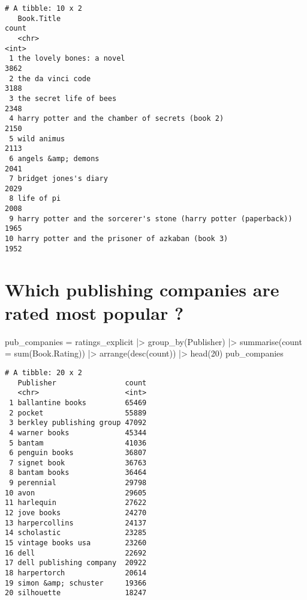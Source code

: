 \documentclass[
]{report}
\newenvironment{Shaded}{\begin{snugshade}}{\end{snugshade}}
\newcommand{\AttributeTok}[1]{\textcolor[rgb]{0.40,0.45,0.13}{#1}}
\newcommand{\DecValTok}[1]{\textcolor[rgb]{0.68,0.00,0.00}{#1}}
\newcommand{\FunctionTok}[1]{\textcolor[rgb]{0.28,0.35,0.67}{#1}}
\newcommand{\NormalTok}[1]{\textcolor[rgb]{0.00,0.23,0.31}{#1}}
\newcommand{\OtherTok}[1]{\textcolor[rgb]{0.00,0.23,0.31}{#1}}
\newcommand{\SpecialCharTok}[1]{\textcolor[rgb]{0.37,0.37,0.37}{#1}}
\begin{document}
\begin{verbatim}
# A tibble: 10 x 2
   Book.Title                                                       count
   <chr>                                                            <int>
 1 the lovely bones: a novel                                         3862
 2 the da vinci code                                                 3188
 3 the secret life of bees                                           2348
 4 harry potter and the chamber of secrets (book 2)                  2150
 5 wild animus                                                       2113
 6 angels &amp; demons                                               2041
 7 bridget jones's diary                                             2029
 8 life of pi                                                        2008
 9 harry potter and the sorcerer's stone (harry potter (paperback))  1965
10 harry potter and the prisoner of azkaban (book 3)                 1952
\end{verbatim}

\section{Which publishing companies are rated most popular
?}\label{which-publishing-companies-are-rated-most-popular}

\begin{Shaded}
\begin{Highlighting}[]
\NormalTok{pub\_companies }\OtherTok{=}\NormalTok{ ratings\_explicit }\SpecialCharTok{|\textgreater{}} \FunctionTok{group\_by}\NormalTok{(Publisher) }\SpecialCharTok{|\textgreater{}}
                             \FunctionTok{summarise}\NormalTok{(}\AttributeTok{count =} \FunctionTok{sum}\NormalTok{(Book.Rating)) }\SpecialCharTok{|\textgreater{}} 
                             \FunctionTok{arrange}\NormalTok{(}\FunctionTok{desc}\NormalTok{(count)) }\SpecialCharTok{|\textgreater{}} \FunctionTok{head}\NormalTok{(}\DecValTok{20}\NormalTok{)}
\NormalTok{pub\_companies}
\end{Highlighting}
\end{Shaded}

\begin{verbatim}
# A tibble: 20 x 2
   Publisher                count
   <chr>                    <int>
 1 ballantine books         65469
 2 pocket                   55889
 3 berkley publishing group 47092
 4 warner books             45344
 5 bantam                   41036
 6 penguin books            36807
 7 signet book              36763
 8 bantam books             36464
 9 perennial                29798
10 avon                     29605
11 harlequin                27622
12 jove books               24270
13 harpercollins            24137
14 scholastic               23285
15 vintage books usa        23260
16 dell                     22692
17 dell publishing company  20922
18 harpertorch              20614
19 simon &amp; schuster     19366
20 silhouette               18247
\end{verbatim}
\end{document}
